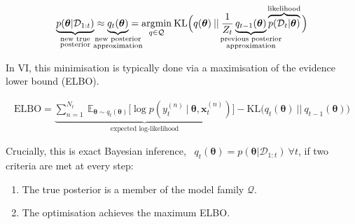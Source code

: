 \documentclass[a4paper,11=0pt]{article}
\let\boldtheta\theta %
\renewcommand{\theta}{\boldsymbol{\boldtheta}} %
\newcommand{\x}{\mathbf{x}}
\begin{document}
\vspace{-2.1em}
\begin{equation}\label{eq:3}
\begin{split}
\underbrace{p(\theta | \mathcal{D}_{1:t})}_{\mathclap{\substack{\text{new true}\\ \text{posterior}}}}\approx \underbrace{q_t(\theta)}_{\mathclap{\substack{\text{new posterior}\\ \text{approximation}}}} &=\underset{q\in\mathcal{Q}}{\mathrm{arg}\mathrm{min}} \: \mathrm{KL}\Big(q(\theta)\:||\:\frac{1}{Z_t}\underbrace{q_{t-1}(\theta)}_{\mathclap{\substack{\text{previous posterior} \\ \text{approximation}}}}\overbrace{p(\mathcal{D}_t|\theta)}^{\mathclap{\text{likelihood}}} \Big)\\
\end{split}
\end{equation}

\vspace{-0.6em}
In VI, this minimisation is typically done via a maximisation of the evidence lower bound (ELBO). 

\vspace{-1.95em}
\begin{equation}\label{eq:4}
\begin{split}
\mathrm{ELBO}= \underbrace{{\textstyle\sum}_{n=1}^{N_t} \> \mathds{E}_{\theta \sim q_t(\theta)}\big[\log p(y_t^{(n)} \:| \:\theta, \x_t^{(n)})\big]}_{\text{expected log-likelihood}} - \mathrm{KL}\big(q_t(\theta)\:||\:q_{t-1}(\theta)\big)
\end{split}
\end{equation} %

\vspace{-0.55em}
Crucially, this is exact Bayesian inference, \ $q_t(\theta)=p(\theta | \mathcal{D}_{1:t}) \: \forall t$, if two criteria are met at every step:

\begin{enumerate}
\item The true posterior is a member of the model family $\mathcal{Q}$.
\item The optimisation achieves the maximum ELBO.

\end{enumerate}
\end{document}
